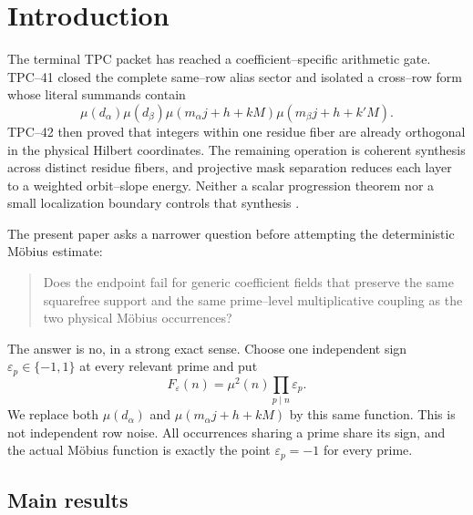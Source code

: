 \section{Introduction}
\label{sec:tpc43-introduction}

The terminal TPC packet has reached a coefficient--specific arithmetic
gate.  TPC--41 closed the complete same--row alias sector and isolated a
cross--row form whose literal summands contain
\begin{equation}
 \mu(d_\alpha)\mu(d_\beta)
 \mu(m_\alpha j+h+kM)\mu(m_\beta j+h+k'M).
 \label{eq:tpc43-intro-four-mobius}
\end{equation}
TPC--42 then proved that integers within one residue fiber are already
orthogonal in the physical Hilbert coordinates.  The remaining operation
is coherent synthesis across distinct residue fibers, and projective mask
separation reduces each layer to a weighted orbit--slope energy.  Neither
a scalar progression theorem nor a small localization boundary controls
that synthesis \citep{WangTPC41,WangTPC42}.

The present paper asks a narrower question before attempting the
deterministic M\"obius estimate:
\begin{quote}
Does the endpoint fail for generic coefficient fields that preserve the
same squarefree support and the same prime--level multiplicative coupling
as the two physical M\"obius occurrences?
\end{quote}
The answer is no, in a strong exact sense.  Choose one independent sign
\(\varepsilon_p\in\{-1,1\}\) at every relevant prime and put
\begin{equation}
 F_\varepsilon(n)=\mu^2(n)\prod_{p\mid n}\varepsilon_p.
 \label{eq:tpc43-intro-rmf}
\end{equation}
We replace both \(\mu(d_\alpha)\) and
\(\mu(m_\alpha j+h+kM)\) by this same function.  This is not independent
row noise.  All occurrences sharing a prime share its sign, and the
actual M\"obius function is exactly the point
\(\varepsilon_p=-1\) for every prime.

\subsection{Main results}

